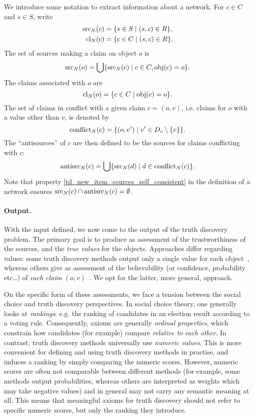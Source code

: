 We introduce some notation to extract information about a network. For $c \in
C$ and $s \in S$, write
\begin{align*}
    \operatorname{src}_N(c) &= \{s \in S \mid (s, c) \in R\},\\
    \operatorname{cl}_N(c) &= \{c \in C \mid (s, c) \in R\}.
\end{align*}
The set of sources making a claim on object $o$ is
\[
    \operatorname{src}_N(o) = \bigcup\{\operatorname{src}_N(c) \mid c \in C, \operatorname{obj}(c) = o\}.
\]
The claims associated with $o$ are
\[
    \operatorname{cl}_N(o) = \{c \in C \mid \operatorname{obj}(c) = o\}.
\]
The set of claims in conflict with a given claim $c = (o, v)$, i.e.  claims for
$o$ with a value other than $v$, is denoted by
\[
    \operatorname{conflict}_N(c) = \{(o, v') \mid v' \in D_o \setminus \{v\}\}.
\]
The ``antisources'' of $c$ are then defined to be the sources for claims
conflicting with $c$:
\[
    \operatorname{antisrc}_N(c) = \bigcup\{\operatorname{src}_N(d) \mid d \in \operatorname{conflict}_N(c)\}.
\]
Note that property \cref{td_new_item_sources_self_consistent} in the definition
of a network ensures $\operatorname{src}_N(c) \cap \operatorname{antisrc}_N(c) = \emptyset$.

\paragraph{Output.}

With the input defined, we now come to the output of the truth discovery
problem.
The primary goal is to produce as assessment of the trustworthiness of the
sources, and the \emph{true values} for the objects. Approaches differ
regarding values: some truth discovery methods output only a single value for
each object~\cite{li2016,ding_finding_2016,yang_continuous_2018}, whereas
others give as assessment of the believability (or confidence, probability
etc\ldots) of \emph{each claim} $(o,
v)$~\cite{yin2008,pasternack2010,galland2010,zhi2015,zhang_robust_2016,zhang2018}.
We opt for the latter, more general, approach.

On the specific form of these assessments, we face a tension between the social
choice and truth discovery perspectives. In social choice theory, one generally
looks at \emph{rankings}: e.g. the ranking of candidates in an election result
according to a voting rule. Consequently, axioms are generally \emph{ordinal
properties}, which constrain how candidates (for example) compare
\emph{relative to each other}. In contrast, truth discovery methods universally
use \emph{numeric values}. This is more convenient for defining and using truth
discovery methods in practise, and induces a ranking by simply comparing the
numeric scores. However, numeric scores are often not comparable between
different methods (for example, some methods output probabilities, whereas
others are interpreted as weights which may take negative values) and in
general may not carry any semantic meaning at all. This means that meaningful
axioms for truth discovery should not refer to specific numeric scores, but
only the ranking they introduce. 


